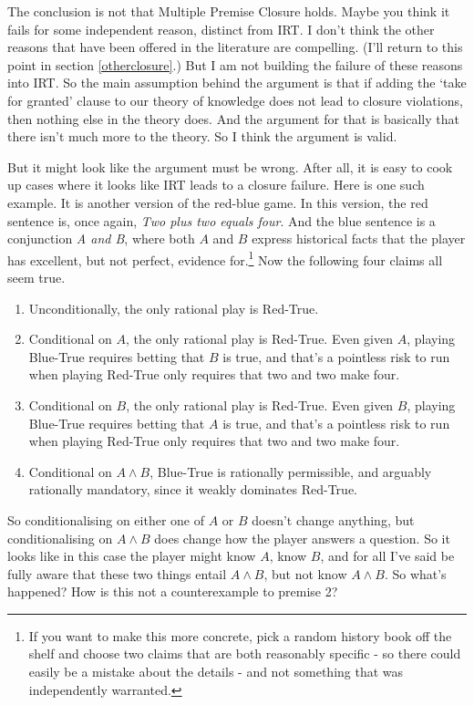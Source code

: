 \documentclass[11pt,]{book}
\providecommand{\tightlist}{%
  \setlength{\itemsep}{0pt}\setlength{\parskip}{0pt}}
\let\rmarkdownfootnote\footnote%
\def\footnote{\protect\rmarkdownfootnote}
\begin{document}
The conclusion is not that Multiple Premise Closure holds. Maybe you think it fails for some independent reason, distinct from IRT. I don't think the other reasons that have been offered in the literature are compelling. (I'll return to this point in section \ref{otherclosure}.) But I am not building the failure of these reasons into IRT. So the main assumption behind the argument is that if adding the `take for granted' clause to our theory of knowledge does not lead to closure violations, then nothing else in the theory does. And the argument for that is basically that there isn't much more to the theory. So I think the argument is valid.

But it might look like the argument must be wrong. After all, it is easy to cook up cases where it looks like IRT leads to a closure failure. Here is one such example. It is another version of the red-blue game. In this version, the red sentence is, once again, \emph{Two plus two equals four}. And the blue sentence is a conjunction \emph{A and B}, where both \(A\) and \(B\) express historical facts that the player has excellent, but not perfect, evidence for.\footnote{If you want to make this more concrete, pick a random history book off the shelf and choose two claims that are both reasonably specific - so there could easily be a mistake about the details - and not something that was independently warranted.} Now the following four claims all seem true.

\begin{enumerate}
\def\labelenumi{\arabic{enumi}.}
\tightlist
\item
  Unconditionally, the only rational play is Red-True.
\item
  Conditional on \(A\), the only rational play is Red-True. Even given \(A\), playing Blue-True requires betting that \(B\) is true, and that's a pointless risk to run when playing Red-True only requires that two and two make four.
\item
  Conditional on \(B\), the only rational play is Red-True. Even given \(B\), playing Blue-True requires betting that \(A\) is true, and that's a pointless risk to run when playing Red-True only requires that two and two make four.
\item
  Conditional on \(A \wedge B\), Blue-True is rationally permissible, and arguably rationally mandatory, since it weakly dominates Red-True.
\end{enumerate}

So conditionalising on either one of \(A\) or \(B\) doesn't change anything, but conditionalising on \(A \wedge B\) does change how the player answers a question. So it looks like in this case the player might know \(A\), know \(B\), and for all I've said be fully aware that these two things entail \(A \wedge B\), but not know \(A \wedge B\). So what's happened? How is this not a counterexample to premise 2?
\end{document}
